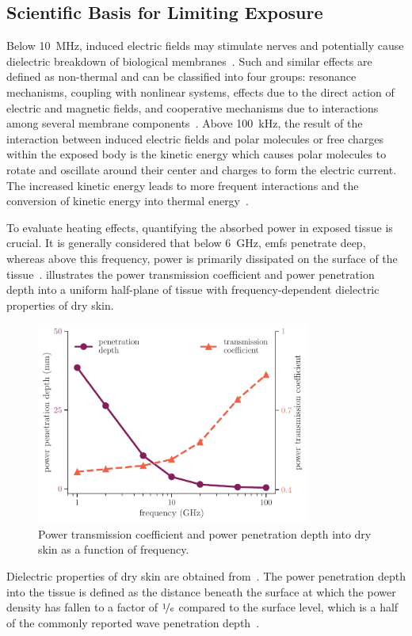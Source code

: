 \subsection{Scientific Basis for Limiting Exposure}
Below \SI{10}{\MHz}, induced electric fields may stimulate nerves and potentially cause dielectric breakdown of biological membranes~\cite{Swicord2008Has}.
Such and similar effects are defined as non-thermal and can be classified into four groups: resonance mechanisms, coupling with nonlinear systems, effects due to the direct action of electric and magnetic fields, and cooperative mechanisms due to interactions among several membrane components~\cite{DInzeo2009Deliverable}.
Above \SI{100}{\kHz}, the result of the interaction between induced electric fields and polar molecules or free charges within the exposed body is the kinetic energy which causes polar molecules to rotate and oscillate around their center and charges to form the electric current.
The increased kinetic energy leads to more frequent interactions and the conversion of kinetic energy into thermal energy~\cite{Foster2018Modeling}.

To evaluate heating effects, quantifying the absorbed power in exposed tissue is crucial.
It is generally considered that below \SI{6}{\GHz}, \gls{emf}s penetrate deep, whereas above this frequency, power is primarily dissipated on the surface of the tissue~\cite{Ziskin2018Tissue}.
 illustrates the power transmission coefficient and power penetration depth into a uniform half-plane of tissue with frequency-dependent dielectric properties of dry skin.
\begin{figure}[t]
    \centering
    \includegraphics[width=0.8\textwidth]{artwork/penetration_depth.pdf}
    \caption{Power transmission coefficient and power penetration depth into dry skin as a function of frequency.}
    \label{fig:penetration_depth}
\end{figure}
Dielectric properties of dry skin are obtained from~\cite{Gabriel1996Compilation}.
The power penetration depth into the tissue is defined
as the distance beneath the surface at which the power density has fallen to a factor of $\nicefrac{1}{e}$ compared to the surface level, which is a half of the commonly reported wave penetration depth~\cite{Foster2016Thermal}.

